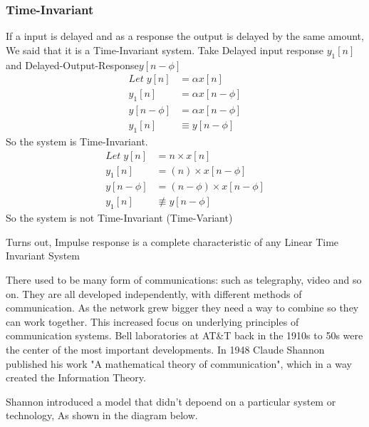 \documentclass{article}
\newlength\tindent
\renewcommand{\indent}{\hspace*{\tindent}}
\begin{document}
    \subsubsection{Time-Invariant}
    If a input is delayed and as a response the output is delayed by the same amount,
    We said that it is a Time-Invariant system. 
    Take Delayed input response $y_1[n]$ and Delayed-Output-Response$y[n-\phi]$
    \begin{align}
        Let\; y[n] &= \alpha x[n] \\
        y_1[n] &= \alpha x[n - \phi] \\
        y[n - \phi] &= \alpha x[n - \phi]\\
        y_1[n] &\equiv y[n - \phi]
    \end{align}
    So the system is Time-Invariant.
    \begin{align}
        Let\; y[n] &= n \times x[n] \\
        y_1[n] &= (n)\times x[n - \phi] \\
        y[n - \phi] &= (n - \phi)\times x[n - \phi]\\
        y_1[n] &\not\equiv y[n - \phi]
    \end{align}
    So the system is not Time-Invariant (Time-Variant)\\\indent

    Turns out, Impulse response is a complete characteristic of any Linear Time Invariant System\\\indent

    There used to be many form of communications: such as telegraphy, video and so on. 
    They are all developed independently, with different methods of communication.
    As the network grew bigger they need a way to combine so they can work together.
    This increased focus on underlying principles of communication systems.
    Bell laboratories at AT\&T back in the 1910s to 50s were the center of the most important developments.
    In 1948 Claude Shannon published his work "A mathematical theory of communication", 
    which in a way created the Information Theory.\\\indent

    Shannon introduced a model that didn't depoend on a particular system or technology,
    As shown in the diagram below.
\end{document}
